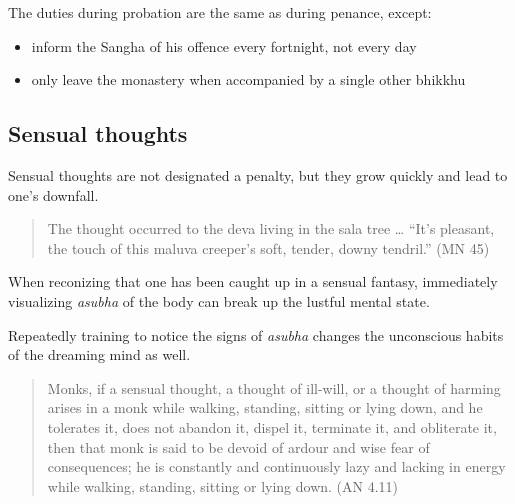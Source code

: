 The duties during probation are the same as during penance, except:

\begin{itemize}
\tightlist
\item
  inform the Sangha of his offence every fortnight, not every day
\item
  only leave the monastery when accompanied by a single other bhikkhu
\end{itemize}

\subsection{Sensual thoughts}

Sensual thoughts are not designated a penalty, but they grow quickly and
lead to one's downfall.

\begin{quote}
The thought occurred to the deva living in the sala tree \ldots{} ``It's
pleasant, the touch of this maluva creeper's soft, tender, downy
tendril.'' (MN 45)
\end{quote}

When reconizing that one has been caught up in a sensual fantasy,
immediately visualizing \emph{asubha} of the body can break up the
lustful mental state.

Repeatedly training to notice the signs of \emph{asubha} changes the
unconscious habits of the dreaming mind as well.

\begin{quote}
Monks, if a sensual thought, a thought of ill-will, or a thought of
harming arises in a monk while walking, standing, sitting or lying down,
and he tolerates it, does not abandon it, dispel it, terminate it, and
obliterate it, then that monk is said to be devoid of ardour and wise
fear of consequences; he is constantly and continuously lazy and lacking
in energy while walking, standing, sitting or lying down. (AN 4.11)
\end{quote}

